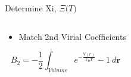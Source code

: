 \documentclass{beamer}
\renewcommand{\vec}[1]{\mathbf{#1}}
\begin{document}
\begin{frame}{Determine Xi, $\Xi{(}T)$}
	\begin{columns}[t]
	    \vspace{-0.5em}
		\begin{block}{}
            \begin{itemize}
			    \item Match 2nd Virial Coefficients
			\end{itemize}
		    
		    \begin{displaymath}B_2=-\frac{1}{2}\int_{Volume} e^{-\frac{V(r)}{k_{B}T}}-1~d\vec r\end{displaymath} 					    
		     

\end{block}
\end{columns}
\end{frame}
\end{document}
